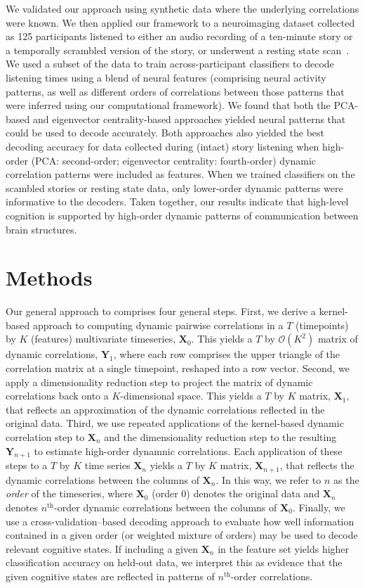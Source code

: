 \documentclass[english]{article}
\begin{document}
We validated our approach using synthetic data where the underlying
correlations were known.  We then applied our framework to a
neuroimaging dataset collected as 125 participants listened to either
an audio recording of a ten-minute story or a temporally scrambled
version of the story, or underwent a resting state
scan~\citep{SimoEtal16}.  We used a subset of the data to train
across-participant classifiers to decode listening times using a blend
of neural features (comprising neural activity patterns, as well as
different orders of correlations between those patterns that were
inferred using our computational framework).  We found that both the
PCA-based and eigenvector centrality-based approaches yielded neural
patterns that could be used to decode accurately.  Both approaches
also yielded the best decoding accuracy for data collected during
(intact) story listening when high-order (PCA:
second-order; eigenvector centrality: fourth-order) dynamic
correlation patterns were included as features.  When we trained
classifiers on the scambled stories or resting state data, only
lower-order dynamic patterns were informative to the decoders.  Taken
together, our results indicate that high-level cognition is supported
by high-order dynamic patterns of communication between brain
structures.

\section*{Methods}
Our general approach to comprises four general steps.  First, we
derive a kernel-based approach to computing dynamic pairwise
correlations in a $T$ (timepoints) by $K$ (features) multivariate
timeseries, $\mathbf{X}_0$.  This yields a $T$ by $\mathcal{O}(K^2)$ matrix of
dynamic correlations, $\mathbf{Y}_1$, where each row comprises the upper
triangle of the correlation matrix at a single timepoint, reshaped
into a row vector.  Second, we apply a dimensionality reduction step
to project the matrix of dynamic correlations back onto a
$K$-dimensional space.  This yields a $T$ by $K$ matrix, $\mathbf{X}_1$, that
reflects an approximation of the dynamic correlations reflected in the
original data.  Third, we use repeated applications of the
kernel-based dynamic correlation step to $\mathbf{X}_n$ and the dimensionality
reduction step to the resulting $\mathbf{Y}_{n+1}$ to estimate high-order
dynamnic correlations.  Each application of these steps to a $T$ by
$K$ time series $\mathbf{X}_n$ yields a $T$ by $K$ matrix, $\mathbf{X}_{n+1}$, that
reflects the dynamic correlations between the columns of $\mathbf{X}_n$.  In
this way, we refer to $n$ as the \textit{order} of the timeseries,
where $\mathbf{X}_0$ (order 0) denotes the original data and $\mathbf{X}_n$ denotes
$n^\mathrm{th}$-order dynamic correlations between the columns of
$\mathbf{X}_0$.  Finally, we use a cross-validation--based decoding approach to
evaluate how well information contained in a given order (or weighted
mixture of orders) may be used to decode relevant cognitive states.
If including a given $\mathbf{X}_n$ in the feature set yields higher
classification accuracy on held-out data, we interpret this as
evidence that the given cognitive states are reflected in patterns of
$n^\mathrm{th}$-order correlations.
\end{document}
